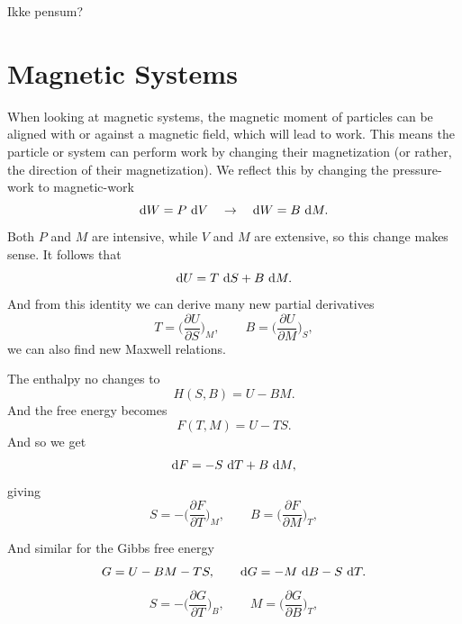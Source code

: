 \documentclass[a4paper, 11pt, notitlepage, english]{article}
\renewcommand{\d}{{\rm d}}
\newcommand{\p}{\partial}
\begin{document}
Ikke pensum?


\clearpage

\section*{Magnetic Systems}

When looking at magnetic systems, the magnetic moment of particles can be aligned with or against a magnetic field, which will lead to work. This means the particle or system can perform work by changing their magnetization (or rather, the direction of their magnetization). We reflect this by changing the pressure-work to magnetic-work
$$\d W = P\ \d V \quad \to \quad \d W = B\ \d M.$$
Both $P$ and $M$ are intensive, while $V$ and $M$ are extensive, so this change makes sense. It follows that
$$\d U = T\ \d S + B \ \d M.$$
And from this identity we can derive many new partial derivatives
$$T = \bigg(\frac{\p U}{\p S}\bigg)_M, \qquad B = \bigg(\frac{\p U}{\p M}\bigg)_S,$$
we can also find new Maxwell relations.

The enthalpy no changes to
$$H(S, B) = U - BM.$$
And the free energy becomes
$$F(T, M) = U - TS.$$
And so we get
$$\d F = -S \ \d T + B\ \d M,$$
giving
$$S = -\bigg(\frac{\p F}{\p T}\bigg)_M, \qquad B = \bigg(\frac{\p F}{\p M}\bigg)_T,$$

And similar for the Gibbs free energy
$$G = U - BM - TS, \qquad \d G = - M\ \d B - S\ \d T.$$
$$S = -\bigg(\frac{\p G}{\p T}\bigg)_B, \qquad M = \bigg(\frac{\p G}{\p B}\bigg)_T,$$
\end{document}

